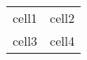 \documentclass{article}
\begin{document}
  \begin{center}
    \begin{tabular}{ll}
      cell1 & cell2 \\
      cell3 & cell4 \\
    \end{tabular}
  \end{center}
\end{document}
